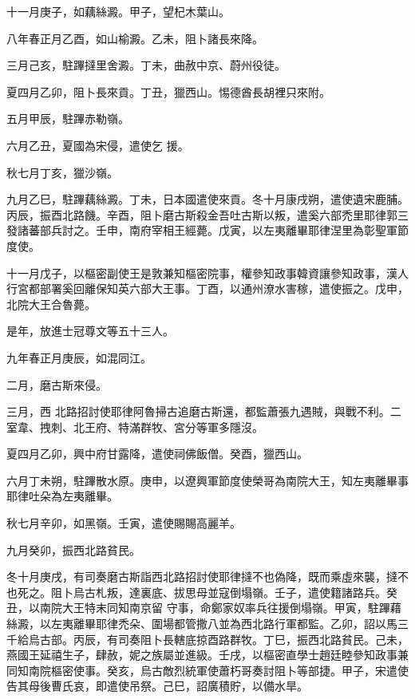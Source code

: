 \begin{pinyinscope}
 十一月庚子，如藕絲澱。甲子，望杞木葉山。



 八年春正月乙酉，如山榆澱。乙未，阻卜諸長來降。



 三月己亥，駐蹕撻里舍澱。丁未，曲赦中京、蔚州役徒。



 夏四月乙卯，阻卜長來貢。丁丑，獵西山。惕德酋長胡裡只來附。



 五月甲辰，駐蹕赤勒嶺。



 六月乙丑，夏國為宋侵，遣使乞
 援。



 秋七月丁亥，獵沙嶺。



 九月乙巳，駐蹕藕絲澱。丁未，日本國遣使來貢。冬十月康戌朔，遣使遺宋鹿脯。丙辰，振酉北路饑。辛酉，阻卜磨古斯殺金吾吐古斯以叛，遣奚六部禿里耶律郭三發諸蕃部兵討之。壬申，南府宰相王經薨。戊寅，以左夷離畢耶律涅里為彰聖軍節度使。



 十一月戊子，以樞密副使王是敦兼知樞密院事，權參知政事韓資讓參知政事，漢人行宮都部署奚回離保知英六部大王事。丁酉，以通州潦水害稼，遣使振之。戊申，北院大王合魯薨。



 是年，放進士冠尊文等五十三人。



 九年春正月庚辰，如混同江。



 二月，磨古斯來侵。



 三月，西
 北路招討使耶律阿魯掃古追磨古斯還，都監蕭張九遇賊，與戰不利。二室韋、拽刺、北王府、特滿群牧、宮分等軍多隱沒。



 夏四月乙卯，興中府甘露降，遣使祠佛飯僧。癸酉，獵西山。



 六月丁未朔，駐蹕散水原。庚申，以遼興軍節度使榮哥為南院大王，知左夷離畢事耶律吐朵為左夷離畢。



 秋七月辛卯，如黑嶺。壬寅，遣使賜賜高麗羊。



 九月癸卯，振西北路貧民。



 冬十月庚戌，有司奏磨古斯詣西北路招討使耶律撻不也偽降，既而乘虛來襲，撻不也死之。阻卜烏古札叛，達裏底、拔思母並寇倒塌嶺。壬子，遣使籍諸路兵。癸丑，以南院大王特末同知南京留
 守事，命鄭家奴率兵往援倒塌嶺。甲寅，駐蹕藉絲澱，以左夷離畢耶律禿朵、圍場都管撒八並為西北路行軍都監。乙卯，詔以馬三千給烏古部。丙辰，有司奏阻卜長轄底掠酉路群牧。丁巳，振西北路貧民。己未，燕國王延禧生子，肆赦，妮之族屬並進級。壬戌，以樞密直學士趙廷睦參知政事兼同知南院樞密使事。癸亥，烏古敵烈統軍使蕭朽哥奏討阻卜等部捷。甲子，宋遣使告其母後曹氏哀，即遣使吊祭。己巳，詔廣積貯，以備水旱。




\end{pinyinscope}
